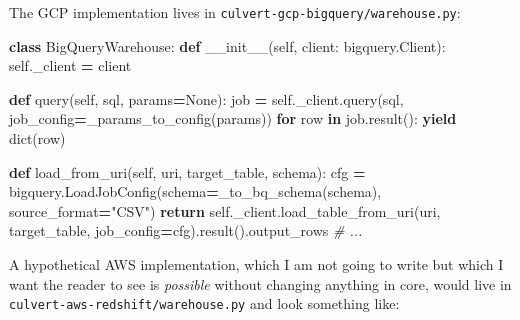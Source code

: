 \documentclass[
  11pt,
  british,
  oneside]{book}
\newenvironment{Shaded}{\begin{snugshade}}{\end{snugshade}}
\newcommand{\BuiltInTok}[1]{#1}
\newcommand{\CommentTok}[1]{\textcolor[rgb]{0.56,0.35,0.01}{\textit{#1}}}
\newcommand{\ControlFlowTok}[1]{\textcolor[rgb]{0.13,0.29,0.53}{\textbf{#1}}}
\newcommand{\FunctionTok}[1]{\textcolor[rgb]{0.00,0.00,0.00}{#1}}
\newcommand{\KeywordTok}[1]{\textcolor[rgb]{0.13,0.29,0.53}{\textbf{#1}}}
\newcommand{\NormalTok}[1]{#1}
\newcommand{\OperatorTok}[1]{\textcolor[rgb]{0.81,0.36,0.00}{\textbf{#1}}}
\newcommand{\StringTok}[1]{\textcolor[rgb]{0.31,0.60,0.02}{#1}}
\newcommand{\VariableTok}[1]{\textcolor[rgb]{0.00,0.00,0.00}{#1}}
\begin{document}
The GCP implementation lives in
\texttt{culvert-gcp-bigquery/warehouse.py}:

\begin{Shaded}
\begin{Highlighting}[]
\KeywordTok{class}\NormalTok{ BigQueryWarehouse:}
    \KeywordTok{def} \FunctionTok{\_\_init\_\_}\NormalTok{(}\VariableTok{self}\NormalTok{, client: bigquery.Client):}
        \VariableTok{self}\NormalTok{.\_client }\OperatorTok{=}\NormalTok{ client}

    \KeywordTok{def}\NormalTok{ query(}\VariableTok{self}\NormalTok{, sql, params}\OperatorTok{=}\VariableTok{None}\NormalTok{):}
\NormalTok{        job }\OperatorTok{=} \VariableTok{self}\NormalTok{.\_client.query(sql, job\_config}\OperatorTok{=}\NormalTok{\_params\_to\_config(params))}
        \ControlFlowTok{for}\NormalTok{ row }\KeywordTok{in}\NormalTok{ job.result():}
            \ControlFlowTok{yield} \BuiltInTok{dict}\NormalTok{(row)}

    \KeywordTok{def}\NormalTok{ load\_from\_uri(}\VariableTok{self}\NormalTok{, uri, target\_table, schema):}
\NormalTok{        cfg }\OperatorTok{=}\NormalTok{ bigquery.LoadJobConfig(schema}\OperatorTok{=}\NormalTok{\_to\_bq\_schema(schema),}
\NormalTok{                                     source\_format}\OperatorTok{=}\StringTok{"CSV"}\NormalTok{)}
        \ControlFlowTok{return} \VariableTok{self}\NormalTok{.\_client.load\_table\_from\_uri(uri, target\_table,}
\NormalTok{                                                job\_config}\OperatorTok{=}\NormalTok{cfg).result().output\_rows}
    \CommentTok{\# ...}
\end{Highlighting}
\end{Shaded}

A hypothetical AWS implementation, which I am not going to write but
which I want the reader to see is \emph{possible} without changing
anything in core, would live in
\texttt{culvert-aws-redshift/warehouse.py} and look something like:
\end{document}
